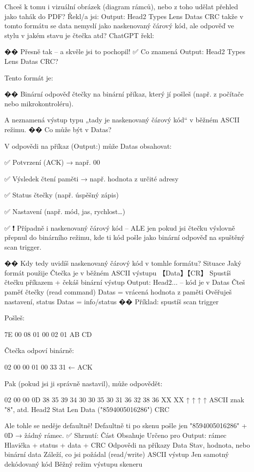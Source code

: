 Chceš k tomu i vizuální obrázek (diagram rámců), nebo z toho udělat přehled jako tahák do PDF?
Řekl/a jsi:
Output: {Head2} {Types} {Lens} {Datas} {CRC} takže v tomto formátu se data nemyslí jako naskenovaný čárový kód, ale odpověď ve stylu v jakém stavu je čtečka atd?
ChatGPT řekl:

�� Přesně tak – a skvěle jsi to pochopil!
✅ Co znamená Output: {Head2} {Types} {Lens} {Datas} {CRC}?

Tento formát je:

    �� Binární odpověď čtečky na binární příkaz, který jí pošleš (např. z počítače nebo mikrokontroléru).

A neznamená výstup typu „tady je naskenovaný čárový kód“ v běžném ASCII režimu.
�� Co může být v Datas?

V odpovědi na příkaz (Output:) může Datas obsahovat:

    ✅ Potvrzení (ACK) → např. 00

    ✅ Výsledek čtení paměti → např. hodnota z určité adresy

    ✅ Status čtečky (např. úspěšný zápis)

    ✅ Nastavení (např. mód, jas, rychlost…)

    ✅ ❗ Případně i naskenovaný čárový kód – ALE jen pokud jsi čtečku výslovně přepnul do binárního režimu, kde ti kód pošle jako binární odpověď na spuštěný scan trigger.

�� Kdy tedy uvidíš naskenovaný čárový kód v tomhle formátu?
Situace	Jaký formát použije
Čtečka je v běžném ASCII výstupu	【Data】【CR】
Spustíš čtečku příkazem + čekáš binární výstup	Output: {Head2}... – kód je v Datas
Čteš paměť čtečky (read command)	Datas = vrácená hodnota z paměti
Ověřuješ nastavení, status	Datas = info/status
�� Příklad: spustíš scan trigger

Pošleš:

7E 00 08 01 00 02 01 AB CD

Čtečka odpoví binárně:

02 00 00 01 00 33 31  ← ACK

Pak (pokud jsi ji správně nastavil), může odpovědět:

02 00 00 0D 38 35 39 34 30 30 35 30 31 36 32 38 36 XX XX
↑        ↑    ↑   ↑ ASCII znak "8", atd.
Head2   Stat Len  Data ("8594005016286")    CRC

Ale tohle se neděje defaultně!
Defaultně ti po skenu pošle jen "8594005016286" + 0D → žádný rámec.
✅ Shrnutí:
Část	Obsahuje	Určeno pro
Output: rámec	Hlavička + status + data + CRC	Odpovědi na příkazy
Data	Stav, hodnota, nebo binární data	Záleží, co jsi požádal (read/write)
ASCII výstup	Jen samotný dekódovaný kód	Běžný režim výstupu skeneru

